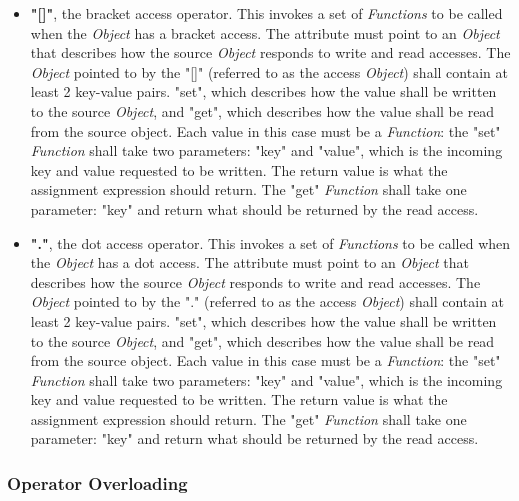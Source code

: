 \documentclass[12pt,letterpaper]{report}
\begin{document}
\begin{itemize}
  \item \textbf{"[]"}, the bracket access operator. This invokes a set of \textit{Functions} to be called when 
  the \textit{Object} has a bracket access. The attribute must point to an \textit{Object} that 
  describes how the source \textit{Object} responds to write and read accesses. The \textit{Object} pointed to 
  by the "[]" (referred to as the access \textit{Object}) shall contain at least 2 key-value pairs.
  "set", which describes how the value shall be written to the source \textit{Object}, and "get",
  which describes how the value shall be read from the source object. Each value in this case 
  must be a \textit{Function}: the "set" \textit{Function} shall take two parameters: "key" and "value", which 
  is the incoming key and value requested to be written. The return value is what the assignment expression should return. 
  The "get" \textit{Function} shall take one parameter: "key" and return what should be returned by the read access.
  


  \item \textbf{"."}, the dot access operator. This invokes a set of \textit{Functions} to be called when 
  the \textit{Object} has a dot access. The attribute must point to an \textit{Object} that 
  describes how the source \textit{Object} responds to write and read accesses. The \textit{Object} pointed to 
  by the "." (referred to as the access \textit{Object}) shall contain at least 2 key-value pairs.
  "set", which describes how the value shall be written to the source \textit{Object}, and "get",
  which describes how the value shall be read from the source object. Each value in this case 
  must be a \textit{Function}: the "set" \textit{Function} shall take two parameters: "key" and "value", which 
  is the incoming key and value requested to be written. The return value is what the assignment expression should return. 
  The "get" \textit{Function} shall take one parameter: "key" and return what should be returned by the read access.


\end{itemize}

\subsubsection{Operator Overloading}\label{Operator Overloading}
\end{document}
